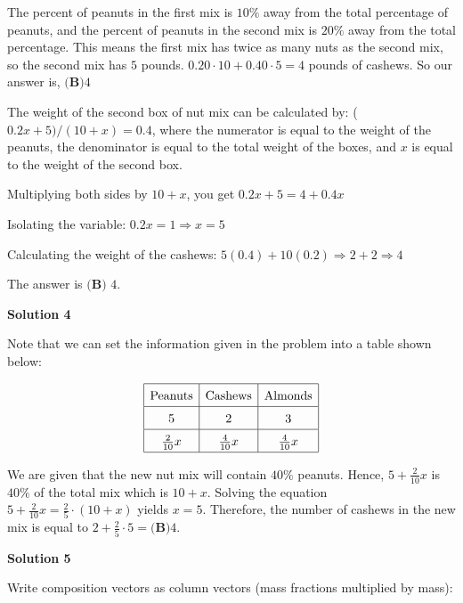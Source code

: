 \begin{enumerate}
The percent of peanuts in the first mix is $10\%$ away from the total percentage of peanuts, and the percent of peanuts in the second mix is $20\%$ away from the total percentage. This means the first mix has twice as many nuts as the second mix, so the second mix has $5$ pounds. $0.20 \cdot 10 + 0.40 \cdot 5 = 4$ pounds of cashews. So our answer is, $\boxed{\textbf{(B)}4}$

 The weight of the second box of nut mix can be calculated by: ($0.2x + 5) / (10 + x) = 0.4$, where the numerator is equal to the weight of the peanuts, the denominator is equal to the total weight of the boxes, and $x$ is equal to the weight of the second box.

 Multiplying both sides by $10 + x$, you get $0.2x + 5 = 4 + 0.4x$

 Isolating the variable: $0.2x = 1$$\Rightarrow x = 5$

 Calculating the weight of the cashews: $5(0.4) + 10(0.2)$$\Rightarrow 2 + 2$$\Rightarrow 4$

 The answer is $\boxed{\textbf{(B) } 4}$.

 



\textbf{Solution 4}

Note that we can set the information given in the problem into a table shown below:

 
 \[\renewcommand{\arraystretch}{1.5} \begin{centering} \begin{array}{| c | c | c |} \hline \text{Peanuts} & \text{Cashews} & \text{Almonds}\\ \hline 5 & 2 & 3\\ \hline \frac{2}{10}x & \frac{4}{10}x & \frac{4}{10}x\\ \hline \end{array} \end{centering}\]

 We are given that the new nut mix will contain $40\%$ peanuts. Hence, $5 + \frac{2}{10}x$ is $40\%$ of the total mix which is $10 + x$. Solving the equation $5 + \frac{2}{10}x = \frac{2}{5} \cdot (10 + x)$ yields $x=5.$ Therefore, the number of cashews in the new mix is equal to $2 + \frac{2}{5} \cdot 5 = \boxed{\textbf{(B)}  4}$.

 



\textbf{Solution 5}

Write composition vectors as column vectors (mass fractions multiplied by mass):


\end{enumerate}
